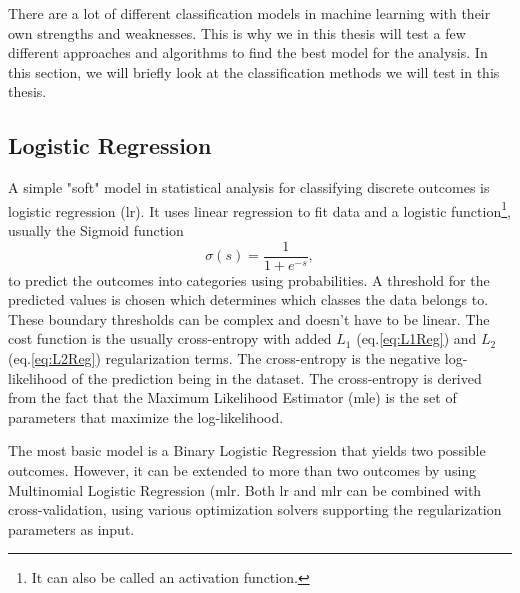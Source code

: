 \documentclass[a4paper, american, 12pt]{report}
\begin{document}
	 There are a lot of different classification models in machine learning with their own strengths and weaknesses. This is why we in this thesis will test a few different approaches and algorithms to find the best model for the analysis. In this section, we will briefly look at the classification methods we will test in this thesis.
	
	
	\subsection{Logistic Regression}
	\label{subsect:Theory-LogisticRegression}
	A simple "soft" model in statistical analysis for classifying discrete outcomes is logistic regression (\acrshort{lr})\cite{mehta2019high}. It uses linear regression to fit data and a logistic function\footnote{It can also be called an activation function.}, usually the Sigmoid function 
	\begin{equation}
	\label{eq:Sigmoid}
		\sigma(s) = \frac{1}{1+e^{-s}},
	\end{equation}
	to predict the outcomes into categories using probabilities. A threshold for the predicted values is chosen which determines which classes the data belongs to. These boundary thresholds can be complex and doesn't have to be linear. The cost function is the usually cross-entropy with added $L_1$ (eq.\ref{eq:L1Reg}) and $L_2$ (eq.\ref{eq:L2Reg}) regularization terms. The cross-entropy is the negative log-likelihood of the prediction being in the dataset. The cross-entropy is derived from the fact that the Maximum Likelihood Estimator (\acrshort{mle}) is the set of parameters that maximize the log-likelihood.
	
	The most basic model is a Binary Logistic Regression that yields two possible outcomes. However, it can be extended to more than two outcomes by using Multinomial Logistic Regression (\acrshort{mlr}. Both \acrshort{lr} and \acrshort{mlr} can be combined with cross-validation, using various optimization solvers supporting the regularization parameters as input.
	
	
\end{document}
